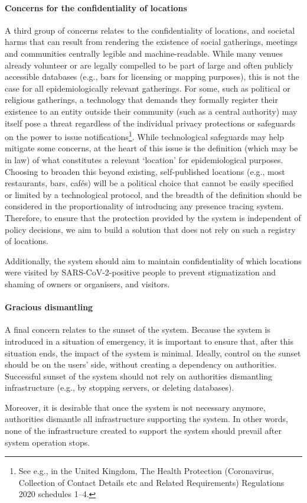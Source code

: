 \paragraph{Concerns for the confidentiality of locations}
A third group of concerns relates to the confidentiality of locations, and societal harms that can result from rendering the existence of social gatherings, meetings and communities centrally legible and machine-readable. While many venues already volunteer or are legally compelled to be part of large and often publicly accessible databases (e.g., bars for licensing or mapping purposes), this is not the case for all epidemiologically relevant gatherings. For some, such as political or religious gatherings, a technology that demands they formally register their existence to an entity outside their community (such as a central authority) may itself pose a threat regardless of the individual privacy protections or safeguards on the power to issue notifications\footnote{See e.g., in the United Kingdom, The Health Protection (Coronavirus, Collection of Contact Details etc and Related Requirements) Regulations 2020 schedules 1--4.}. While technological safeguards may help mitigate some concerns, at the heart of this issue is the definition (which may be in law) of what constitutes a relevant `location' for epidemiological purposes. Choosing to broaden this beyond existing, self-published locations (e.g., most restaurants, bars, cafés) will be a political choice that cannot be easily specified or limited by a technological protocol, and the breadth of the definition should be considered in the proportionality of introducing any presence tracing system. Therefore, to ensure that the protection provided by the system is independent of policy decisions, we aim to build a solution that does not rely on such a registry of locations.

Additionally, the system should aim to maintain confidentiality of which locations were visited by SARS-CoV-2-positive people to prevent stigmatization and shaming of owners or organisers, and visitors.

\paragraph{Gracious dismantling}
A final concern relates to the sunset of the system. Because the system is introduced in a situation of emergency, it is important to ensure that, after this situation ends, the impact of the system is minimal. Ideally, control on the sunset should be on the users' side, without creating a dependency on authorities. Successful sunset of the system should not rely on authorities dismantling infrastructure (e.g., by stopping servers, or deleting databases).

Moreover, it is desirable that once the system is not necessary anymore, authorities dismantle all infrastructure supporting the system. In other words, none of the infrastructure created to support the system should prevail after system operation stops.
